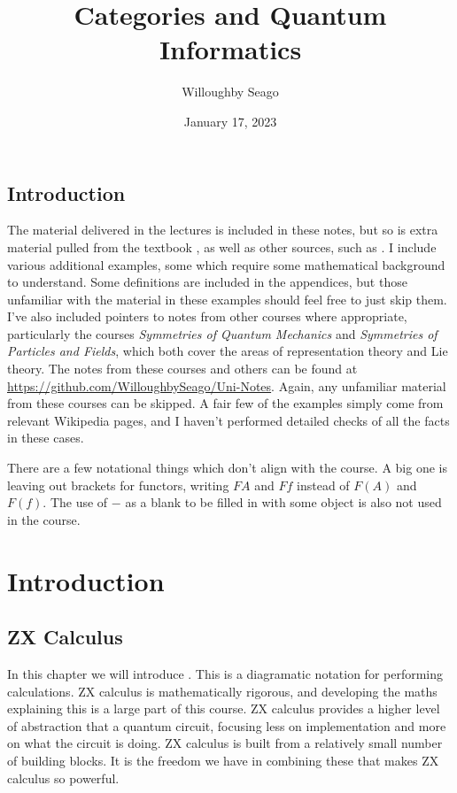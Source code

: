\documentclass[fleqn]{NotesClass}
\title{Categories and Quantum Informatics}
\author{Willoughby Seago}
\date{January 17, 2023}
\newcommand*{\course}[1]{\textit{#1}}
\begin{document}
    \frontmatter
    \titlepage
    \tableofcontents
    \listoffigures
    \mainmatter
    
    \chapter{Introduction}
    The material delivered in the lectures is included in these notes, but so is extra material pulled from the textbook \cite{heunen}, as well as other sources, such as \cite{leinster}.
    I include various additional examples, some which require some mathematical background to understand.
    Some definitions are included in the appendices, but those unfamiliar with the material in these examples should feel free to just skip them.
    I've also included pointers to notes from other courses where appropriate, particularly the courses \course{Symmetries of Quantum Mechanics} and \course{Symmetries of Particles and Fields}, which both cover the areas of representation theory and Lie theory.
    The notes from these courses and others can be found at \url{https://github.com/WilloughbySeago/Uni-Notes}.
    Again, any unfamiliar material from these courses can be skipped.
    A fair few of the examples simply come from relevant Wikipedia pages, and I haven't performed detailed checks of all the facts in these cases.
    
    There are a few notational things which don't align with the course.
    A big one is leaving out brackets for functors, writing \(FA\) and \(Ff\) instead of \(F(A)\) and \(F(f)\).
    The use of \(-\) as a blank to be filled in with some object is also not used in the course.
    
    \part{Introduction}
    
    \chapter{ZX Calculus}
    In this chapter we will introduce .
    This is a diagramatic notation for performing calculations.
    ZX calculus is mathematically rigorous, and developing the maths explaining this is a large part of this course.
    ZX calculus provides a higher level of abstraction that a quantum circuit, focusing less on implementation and more on what the circuit is doing.
    ZX calculus is built from a relatively small number of building blocks.
    It is the freedom we have in combining these that makes ZX calculus so powerful.
    
\end{document}
